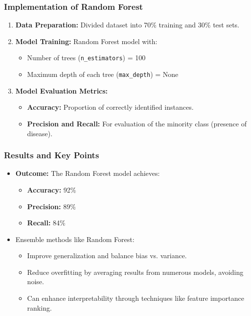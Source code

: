 \documentclass[aspectratio=169]{beamer}
\begin{document}
\begin{frame}[fragile]
    \frametitle{Implementation of Random Forest}
    \begin{enumerate}
        \item \textbf{Data Preparation:} Divided dataset into 70\% training and 30\% test sets.
        \item \textbf{Model Training:} Random Forest model with:
            \begin{itemize}
                \item Number of trees (\texttt{n\_estimators}) = 100
                \item Maximum depth of each tree (\texttt{max\_depth}) = None
            \end{itemize}
        \item \textbf{Model Evaluation Metrics:}
            \begin{itemize}
                \item \textbf{Accuracy:} Proportion of correctly identified instances.
                \item \textbf{Precision and Recall:} For evaluation of the minority class (presence of disease).
            \end{itemize}
    \end{enumerate}
\end{frame}

\begin{frame}[fragile]
    \frametitle{Results and Key Points}
    \begin{itemize}
        \item \textbf{Outcome:} The Random Forest model achieves:
            \begin{itemize}
                \item \textbf{Accuracy:} 92\%
                \item \textbf{Precision:} 89\%
                \item \textbf{Recall:} 84\%
            \end{itemize}
        \item Ensemble methods like Random Forest:
            \begin{itemize}
                \item Improve generalization and balance bias vs. variance.
                \item Reduce overfitting by averaging results from numerous models, avoiding noise.
                \item Can enhance interpretability through techniques like feature importance ranking.
            \end{itemize}
    \end{itemize}
\end{frame}
\end{document}
